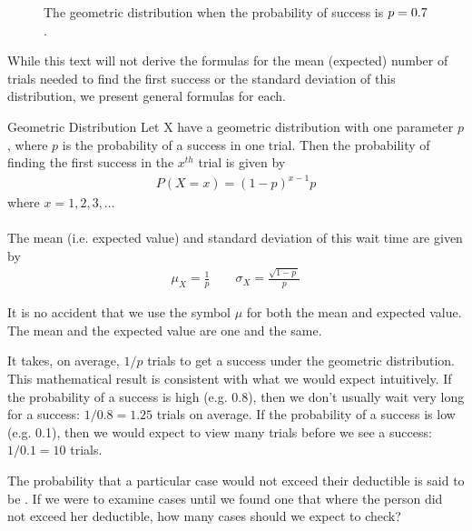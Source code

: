 \begin{figure}[h]
  \centering
  \caption{The geometric distribution when the probability
      of success is $p = 0.7{}$.}
  \label{geometricDist70}
\end{figure}

While this text will not derive the formulas for the mean (expected) number of trials needed to find the first success or the standard deviation of this distribution, we present general formulas for each.

\begin{onebox}{Geometric Distribution}
  Let X have a geometric distribution with one parameter $p$, where $p$ is the probability of a success in one trial.   Then the
  probability of finding the first success in the
  $x^{th}$ trial is given by\vspace{-1.5mm}
  \begin{align*}
  P(X = x) = (1-p)^{x-1}p
  \end{align*}
where $x=1,2,3,\dots$\\
\\
  The mean (i.e. expected value) and standard deviation of this wait time are given by
  \begin{align*}
  \mu_{\scriptscriptstyle{X}} = \frac{1}{p}
      \qquad \sigma_{\scriptscriptstyle{X}} = \frac{\sqrt{1-p\ }}{p}
  \end{align*}
\end{onebox}

It is no accident that we use the symbol $\mu$ for both the mean and expected value. The mean and the expected value are one and the same.

It takes, on average, $1/p$ trials to get a success under the geometric distribution. This mathematical result is consistent with what we would expect intuitively. If the probability of a success is high (e.g. 0.8), then we don't usually wait very long for a success: $1/0.8 = 1.25$ trials on average. If the probability of a success is low (e.g. 0.1), then we would expect to view many trials before we see a success: $1/0.1 = 10$ trials.


\begin{exercisewrap}
\begin{nexercise}
The probability that a particular case would not exceed their
deductible is said to be \insureSprob{}.
If we were to examine cases until we found one that where
the person did not exceed her deductible, how many cases should
we expect to check?\footnotemark{}
\end{nexercise}
\end{exercisewrap}

